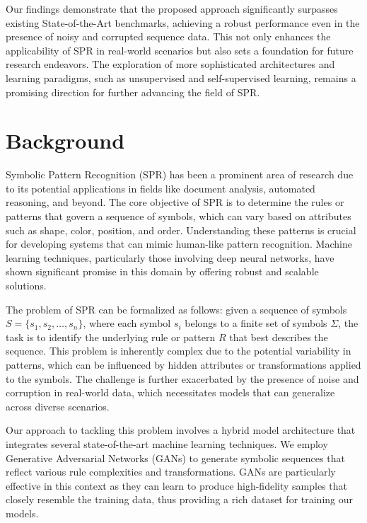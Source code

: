 \documentclass{article}
\begin{document}
Our findings demonstrate that the proposed approach significantly surpasses existing State-of-the-Art benchmarks, achieving a robust performance even in the presence of noisy and corrupted sequence data. This not only enhances the applicability of SPR in real-world scenarios but also sets a foundation for future research endeavors. The exploration of more sophisticated architectures and learning paradigms, such as unsupervised and self-supervised learning, remains a promising direction for further advancing the field of SPR.

\section{Background}
Symbolic Pattern Recognition (SPR) has been a prominent area of research due to its potential applications in fields like document analysis, automated reasoning, and beyond. The core objective of SPR is to determine the rules or patterns that govern a sequence of symbols, which can vary based on attributes such as shape, color, position, and order. Understanding these patterns is crucial for developing systems that can mimic human-like pattern recognition. Machine learning techniques, particularly those involving deep neural networks, have shown significant promise in this domain by offering robust and scalable solutions.

The problem of SPR can be formalized as follows: given a sequence of symbols \( S = \{ s_1, s_2, \ldots, s_n \} \), where each symbol \( s_i \) belongs to a finite set of symbols \(\Sigma\), the task is to identify the underlying rule or pattern \( R \) that best describes the sequence. This problem is inherently complex due to the potential variability in patterns, which can be influenced by hidden attributes or transformations applied to the symbols. The challenge is further exacerbated by the presence of noise and corruption in real-world data, which necessitates models that can generalize across diverse scenarios.

Our approach to tackling this problem involves a hybrid model architecture that integrates several state-of-the-art machine learning techniques. We employ Generative Adversarial Networks (GANs) to generate symbolic sequences that reflect various rule complexities and transformations. GANs are particularly effective in this context as they can learn to produce high-fidelity samples that closely resemble the training data, thus providing a rich dataset for training our models.
\end{document}

